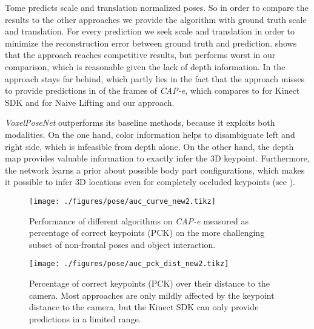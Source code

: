 Tome \etal\cite{tome_lifting_2017} predicts scale and translation normalized poses. So in order to compare the results to the other approaches we provide the algorithm with ground truth scale and translation. For every prediction we seek scale and translation in order to minimize the reconstruction error between ground truth and prediction.  shows that the approach reaches competitive results, but performs worst in our comparison, which is reasonable given the lack of depth information. In  the approach stays far behind, which partly lies in the fact that the approach misses to provide predictions in  of the frames of \textit{CAP-e}, which compares to  for Kinect SDK and  for Naive Lifting and our approach.

\textit{VoxelPoseNet} outperforms its baseline methods, because it exploits both modalities. On the one hand, color information helps to disambiguate left and right side, which is infeasible from depth alone. On the other hand, the depth map provides valuable information to exactly infer the 3D keypoint. Furthermore, the network learns a prior about possible body part configurations, which makes it possible to infer 3D locations even for completely occluded keypoints (see ).

\begin{figure}
    \centering  
        \texttt{[image: ./figures/pose/auc\_curve\_new2.tikz]}
\caption{Performance of different algorithms on \textit{CAP-e} measured as percentage of correct keypoints (PCK) on the more challenging subset of non-frontal poses and object interaction.}\label{fig:auc_curves_cap}
\end{figure}

\begin{figure}
    \centering  
        \texttt{[image: ./figures/pose/auc\_pck\_dist\_new2.tikz]}
\caption{Percentage of correct keypoints (PCK) over their distance to the camera. Most approaches are only mildly affected by the keypoint distance to the camera, but the Kinect SDK can only provide predictions in a limited range.}\label{fig:pck_over_dist}
\end{figure}


